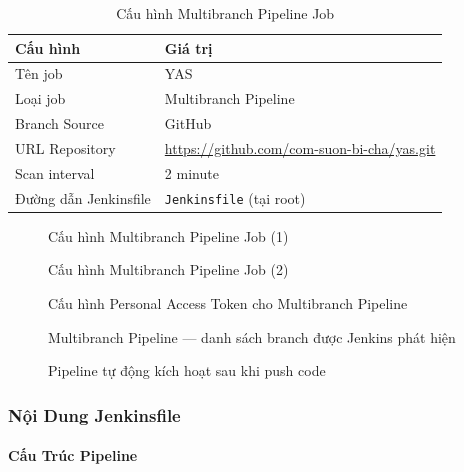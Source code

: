 \begin{table}[H]
\centering
\caption{Cấu hình Multibranch Pipeline Job}
\begin{tabular}{|l|l|}
\hline
\textbf{Cấu hình} & \textbf{Giá trị} \\
\hline
Tên job & YAS \\
\hline
Loại job & Multibranch Pipeline \\
\hline
Branch Source & GitHub \\
\hline
URL Repository & \url{https://github.com/com-suon-bi-cha/yas.git} \\
\hline
Scan interval & 2 minute \\
\hline
Đường dẫn Jenkinsfile & \texttt{Jenkinsfile} (tại root) \\
\hline
\end{tabular}
\end{table}

\begin{figure}[H]
\centering
{}
\caption{Cấu hình Multibranch Pipeline Job (1)}
\end{figure}

\begin{figure}[H]
\centering
{}
\caption{Cấu hình Multibranch Pipeline Job (2)}
\end{figure}

\begin{figure}[H]
\centering
{}
\caption{Cấu hình Personal Access Token cho Multibranch Pipeline}
\end{figure}

\begin{figure}[H]
\centering
{}
\caption{Multibranch Pipeline — danh sách branch được Jenkins phát hiện}
\end{figure}

\begin{figure}[H]
\centering
{}
\caption{Pipeline tự động kích hoạt sau khi push code}
\end{figure}

\subsubsection{Nội Dung Jenkinsfile}

\paragraph{Cấu Trúc Pipeline}


